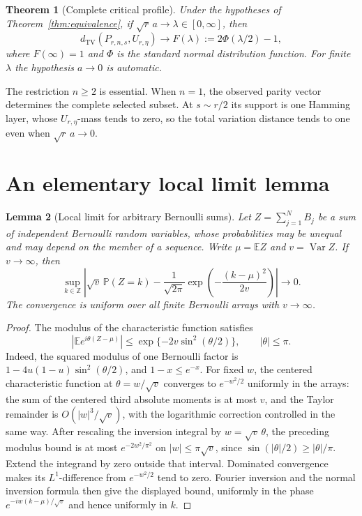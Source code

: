 \documentclass[11pt]{article}
\newtheorem{theorem}{Theorem}
\newtheorem{lemma}[theorem]{Lemma}
\newcommand{\TV}{d_{\mathrm{TV}}}
\newcommand{\E}{\mathbb E}
\newcommand{\Pp}{\mathbb P}
\newcommand{\Var}{\operatorname{Var}}
\newcommand{\PhiN}{\Phi}
\begin{document}
\begin{theorem}[Complete critical profile]\label{thm:profile}
Under the hypotheses of Theorem~\ref{thm:equivalence}, if
$\sqrt r\,a\to\lambda\in[0,\infty]$, then
\[
 \TV(P_{r,n,s},U_{r,\eta})\longrightarrow
 F(\lambda):=2\PhiN(\lambda/2)-1,
\]
where $F(\infty)=1$ and $\PhiN$ is the standard normal distribution function.
For finite $\lambda$ the hypothesis $a\to0$ is automatic.
\end{theorem}

The restriction $n\ge2$ is essential. When $n=1$, the observed parity vector
determines the complete selected subset. At $s\sim r/2$ its support is one
Hamming layer, whose $U_{r,\eta}$-mass tends to zero, so the total variation
distance tends to one even when $\sqrt r\,a\to0$.

\section{An elementary local limit lemma}

\begin{lemma}[Local limit for arbitrary Bernoulli sums]\label{lem:llt}
Let $Z=\sum_{j=1}^N B_j$ be a sum of independent Bernoulli random variables,
whose probabilities may be unequal and may depend on the member of a sequence.
Write $\mu=\E Z$ and $v=\Var Z$. If $v\to\infty$, then
\[
 \sup_{k\in\mathbb Z}\left|\sqrt v\,\Pp(Z=k)
 -\frac1{\sqrt{2\pi}}\exp\left(-\frac{(k-\mu)^2}{2v}\right)\right|\to0.
\]
The convergence is uniform over all finite Bernoulli arrays with $v\to\infty$.
\end{lemma}

\begin{proof}
The modulus of the characteristic function satisfies
\[
 |\E e^{i\theta(Z-\mu)}|
 \le\exp\{-2v\sin^2(\theta/2)\},\qquad |\theta|\le\pi.
\]
Indeed, the squared modulus of one Bernoulli factor is
$1-4u(1-u)\sin^2(\theta/2)$, and $1-x\le e^{-x}$.
For fixed $w$, the centered characteristic function at $\theta=w/\sqrt v$
converges to $e^{-w^2/2}$ uniformly in the arrays: the sum of the centered
third absolute moments is at most $v$, and the Taylor remainder is
$O(|w|^3/\sqrt v)$, with the logarithmic correction controlled in the same way.
After rescaling the inversion integral by $w=\sqrt v\,\theta$, the preceding
modulus bound is at most $e^{-2w^2/\pi^2}$ on $|w|\le\pi\sqrt v$, since
$\sin(|\theta|/2)\ge|\theta|/\pi$. Extend the integrand by zero outside that
interval. Dominated convergence makes its $L^1$-difference from
$e^{-w^2/2}$ tend to zero. Fourier inversion and the normal inversion formula
then give the displayed bound, uniformly in the phase
$e^{-iw(k-\mu)/\sqrt v}$ and hence uniformly in $k$.
\end{proof}
\end{document}
